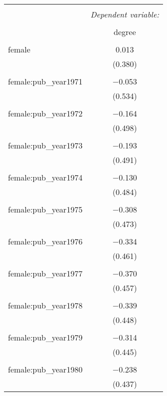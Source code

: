 
\begin{table}[!htbp] \centering 
  \caption{} 
  \label{} 
\begin{tabular}{@{\extracolsep{5pt}}lc} 
\\[-1.8ex]\hline 
\hline \\[-1.8ex] 
 & \multicolumn{1}{c}{\textit{Dependent variable:}} \\ 
\cline{2-2} 
\\[-1.8ex] & degree \\ 
\hline \\[-1.8ex] 
 female & 0.013 \\ 
  & (0.380) \\ 
  & \\ 
 female:pub\_year1971 & $-$0.053 \\ 
  & (0.534) \\ 
  & \\ 
 female:pub\_year1972 & $-$0.164 \\ 
  & (0.498) \\ 
  & \\ 
 female:pub\_year1973 & $-$0.193 \\ 
  & (0.491) \\ 
  & \\ 
 female:pub\_year1974 & $-$0.130 \\ 
  & (0.484) \\ 
  & \\ 
 female:pub\_year1975 & $-$0.308 \\ 
  & (0.473) \\ 
  & \\ 
 female:pub\_year1976 & $-$0.334 \\ 
  & (0.461) \\ 
  & \\ 
 female:pub\_year1977 & $-$0.370 \\ 
  & (0.457) \\ 
  & \\ 
 female:pub\_year1978 & $-$0.339 \\ 
  & (0.448) \\ 
  & \\ 
 female:pub\_year1979 & $-$0.314 \\ 
  & (0.445) \\ 
  & \\ 
 female:pub\_year1980 & $-$0.238 \\ 
  & (0.437) \\ 

\end{tabular}
\end{table}
